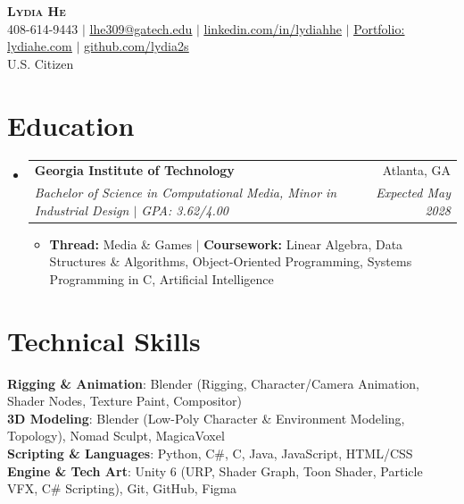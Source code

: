 \documentclass[letterpaper,11pt]{article}
\makeatletter
\newcommand{\resumeItem}[1]{
  \item\small{
    {#1 \vspace{-2pt}}
  }
}
\newcommand{\resumeSubheading}[4]{
  \vspace{-2pt}\item
    \begin{tabular*}{0.97\textwidth}[t]{l@{\extracolsep{\fill}}r}
      \textbf{#1} & #2 \\
      \textit{\small#3} & \textit{\small #4} \\
    \end{tabular*}\vspace{-7pt}
}
\newcommand{\resumeSubHeadingListStart}{\begin{itemize}[leftmargin=0.15in, label={}]}
\newcommand{\resumeSubHeadingListEnd}{\end{itemize}}
\newcommand{\resumeItemListStart}{\begin{itemize}}
\newcommand{\resumeItemListEnd}{\end{itemize}\vspace{-5pt}}
\makeatother
\begin{document}
\begin{center}
    \textbf{\Huge \scshape Lydia He} \\ \vspace{1pt}
    \small 408-614-9443 $|$ \href{mailto:lhe309@gatech.edu}{\underline{lhe309@gatech.edu}} $|$
    \href{https://www.linkedin.com/in/lydiahhe}{\underline{linkedin.com/in/lydiahhe}} $|$
    \href{https://lydiahe.com}{\underline{Portfolio: lydiahe.com}} $|$
    \href{https://github.com/lydia2s}{\underline{github.com/lydia2s}} \\ \vspace{2pt}
    \small U.S. Citizen
\end{center}


\section{Education}
  \resumeSubHeadingListStart
    \resumeSubheading
      {Georgia Institute of Technology}{Atlanta, GA}
      {Bachelor of Science in Computational Media, Minor in Industrial Design $|$ GPA: 3.62/4.00}{Expected May 2028}
      \resumeItemListStart
        \resumeItem{\textbf{Thread:} Media \& Games $|$ \textbf{Coursework:} Linear Algebra, Data Structures \& Algorithms, Object-Oriented Programming, Systems Programming in C, Artificial Intelligence}
      \resumeItemListEnd
  \resumeSubHeadingListEnd


\section{Technical Skills}
 \begin{itemize}[leftmargin=0.15in, label={}]
    \small{\item{
     \textbf{Rigging \& Animation}{: Blender (Rigging, Character/Camera Animation, Shader Nodes, Texture Paint, Compositor)} \\
     \textbf{3D Modeling}{: Blender (Low-Poly Character \& Environment Modeling, Topology), Nomad Sculpt, MagicaVoxel} \\
     \textbf{Scripting \& Languages}{: Python, C\#, C, Java, JavaScript, HTML/CSS} \\
     \textbf{Engine \& Tech Art}{: Unity 6 (URP, Shader Graph, Toon Shader, Particle VFX, C\# Scripting), Git, GitHub, Figma}
    }}
 \end{itemize}
\end{document}
